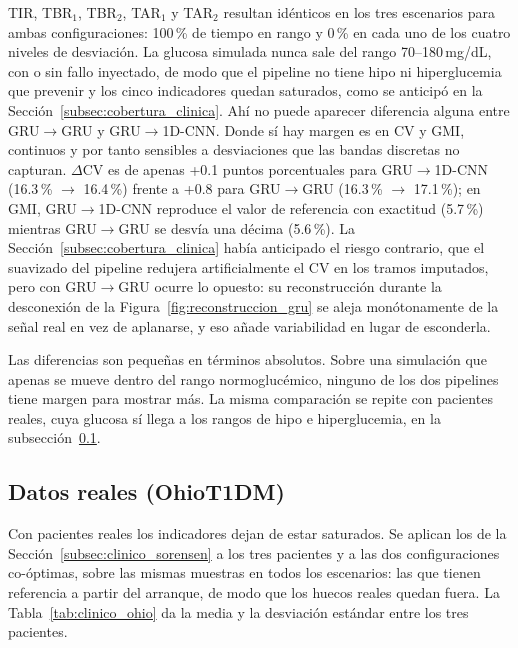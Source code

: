 \documentclass{report}
\begin{document}
TIR, TBR$_1$, TBR$_2$, TAR$_1$ y TAR$_2$ resultan idénticos en los tres escenarios para ambas configuraciones: 100\,\% de tiempo en rango y 0\,\% en cada uno de los cuatro niveles de desviación. La glucosa simulada nunca sale del rango 70--180\,mg/dL, con o sin fallo inyectado, de modo que el pipeline no tiene hipo ni hiperglucemia que prevenir y los cinco indicadores quedan saturados, como se anticipó en la Sección~\ref{subsec:cobertura_clinica}. Ahí no puede aparecer diferencia alguna entre GRU$\to$GRU y GRU$\to$1D-CNN.
\newpage
Donde sí hay margen es en CV y GMI, continuos y por tanto sensibles a desviaciones que las bandas discretas no capturan. $\Delta$CV es de apenas +0.1 puntos porcentuales para GRU$\to$1D-CNN (16.3\,\% $\to$ 16.4\,\%) frente a +0.8 para GRU$\to$GRU (16.3\,\% $\to$ 17.1\,\%); en GMI, GRU$\to$1D-CNN reproduce el valor de referencia con exactitud (5.7\,\%) mientras GRU$\to$GRU se desvía una décima (5.6\,\%). La Sección~\ref{subsec:cobertura_clinica} había anticipado el riesgo contrario, que el suavizado del pipeline redujera artificialmente el CV en los tramos imputados, pero con GRU$\to$GRU ocurre lo opuesto: su reconstrucción durante la desconexión de la Figura~\ref{fig:reconstruccion_gru} se aleja monótonamente de la señal real en vez de aplanarse, y eso añade variabilidad en lugar de esconderla.

Las diferencias son pequeñas en términos absolutos. Sobre una simulación que apenas se mueve dentro del rango normoglucémico, ninguno de los dos pipelines tiene margen para mostrar más. La misma comparación se repite con pacientes reales, cuya glucosa sí llega a los rangos de hipo e hiperglucemia, en la subsección~\ref{subsec:clinico_ohio}.

\subsection{Datos reales (OhioT1DM)}
\label{subsec:clinico_ohio}

Con pacientes reales los indicadores dejan de estar saturados. Se aplican los de la Sección~\ref{subsec:clinico_sorensen} a los tres pacientes y a las dos configuraciones co-óptimas, sobre las mismas muestras en todos los escenarios: las que tienen referencia a partir del arranque, de modo que los huecos reales quedan fuera. La Tabla~\ref{tab:clinico_ohio} da la media y la desviación estándar entre los tres pacientes.
 
\end{document}
